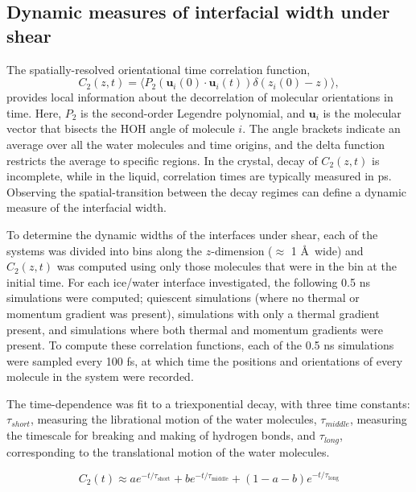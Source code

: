 \documentclass[aps,jcp,preprint,showpacs,superscriptaddress,groupedaddress]{revtex4}  %
\begin{document}
\subsection{Dynamic measures of interfacial width under shear}
The spatially-resolved orientational time correlation function,
\begin{equation}\label{C(t)1}
  C_{2}(z,t)=\langle P_{2}(\mathbf{u}_i(0)\cdot \mathbf{u}_i(t))
  \delta(z_i(0) - z) \rangle,
\end{equation}
provides local information about the decorrelation of molecular
orientations in time. Here, $P_{2}$ is the second-order Legendre
polynomial, and $\mathbf{u}_i$ is the molecular vector that bisects
the HOH angle of molecule $i$.  The angle brackets indicate an average
over all the water molecules and time origins, and the delta function
restricts the average to specific regions. In the crystal, decay of
$C_2(z,t)$ is incomplete, while in the liquid, correlation times are
typically measured in ps.  Observing the spatial-transition between
the decay regimes can define a dynamic measure of the interfacial
width.

To determine the dynamic widths of the interfaces under shear, each of
the systems was divided into bins along the $z$-dimension ($\approx$ 1
\AA\ wide) and $C_2(z,t)$ was computed using only those molecules that
were in the bin at the initial time. For each ice/water interface investigated,
the following 0.5 ns simulations were computed;
quiescent simulations (where no thermal or momentum gradient was present), 
simulations with only a thermal gradient present, and simulations
where both thermal and momentum gradients were present.  
To compute these correlation
functions, each of the 0.5 ns simulations were sampled every 100 fs,
at which time the positions and
orientations of every molecule in the system were recorded. 

The time-dependence was fit to a triexponential decay, with three time
constants: $\tau_{short}$, measuring the librational motion of the
water molecules, $\tau_{middle}$, measuring the timescale for breaking
and making of hydrogen bonds, and $\tau_{long}$, corresponding to the
translational motion of the water molecules.

\begin{equation}
C_{2}(t) \approx a e^{-t/\tau_\mathrm{short}} + b e^{-t/\tau_\mathrm{middle}} + 
(1-a-b) e^{-t/\tau_\mathrm{long}}
\end{equation}
\end{document}
